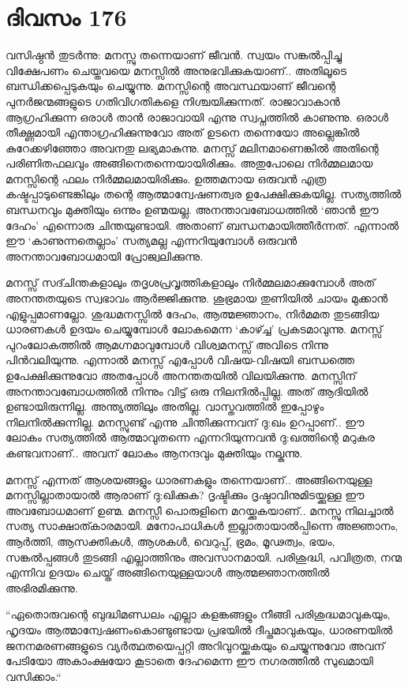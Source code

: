 \section{ദിവസം 176}


വസിഷ്ഠൻ തുടർന്നു: മനസ്സു തന്നെയാണ്‌ ജീവൻ. സ്വയം സങ്കൽപ്പിച്ചു വിക്ഷേപണം ചെയ്തവയെ മനസ്സിൽ അനുഭവിക്കുകയാണ്‌.. അതിലൂടെ ബന്ധിക്കപ്പെടുകയും ചെയ്യുന്നു. മനസ്സിന്റെ അവസ്ഥയാണ്‌ ജീവന്റെ പുനർജന്മങ്ങളുടെ ഗതിവിഗതികളെ നിശ്ചയിക്കുന്നത്. രാജാവാകാൻ ആഗ്രഹിക്കുന്ന ഒരാൾ താൻ രാജാവായി എന്നു സ്വപ്നത്തിൽ കാണുന്നു. ഒരാൾ തീക്ഷ്ണമായി എന്താഗ്രഹിക്കുന്നുവോ അത് ഉടനെ തന്നെയോ അല്ലെങ്കിൽ കുറേക്കഴിഞ്ഞോ അവനതു ലഭ്യമാകുന്നു. മനസ്സ് മലിനമാണെങ്കിൽ അതിന്റെ പരിണിതഫലവും അങ്ങിനെതന്നെയായിരിക്കും. അതുപോലെ നിർമ്മലമായ മനസ്സിന്റെ ഫലം നിർമ്മലമായിരിക്കും. ഉത്തമനായ ഒരുവൻ എത്ര കഷ്ടപ്പാടുണ്ടെങ്കിലും തന്റെ ആത്മാന്വേഷണത്വര ഉപേക്ഷിക്കുകയില്ല. സത്യത്തിൽ ബന്ധനവും മുക്തിയും ഒന്നും ഉണ്മയല്ല. അനന്താവബോധത്തിൽ ‘ഞാൻ ഈ ദേഹം’ എന്നൊരു ചിന്തയുണ്ടായി. അതാണ്‌ ബന്ധനമായിത്തീർന്നത്. എന്നാൽ ഈ ‘കാണുന്നതെല്ലാം’ സത്യമല്ല എന്നറിയുമ്പോൾ ഒരുവൻ അനന്താവബോധമായി പ്രോജ്വലിക്കുന്നു.

മനസ്സ് സദ്ചിന്തകളാലും തദൃശപ്രവൃത്തികളാലും നിർമ്മലമാക്കുമ്പോൾ അത് അനന്തതയുടെ സ്വഭാവം ആർജ്ജിക്കുന്നു. ശുഭ്രമായ തുണിയിൽ ചായം മുക്കാൻ എളുപ്പമാണല്ലോ. ശുദ്ധമനസ്സിൽ ദേഹം, ആത്മജ്ഞാനം, നിർമമത തുടങ്ങിയ ധാരണകൾ ഉദയം ചെയ്യുമ്പോൾ ലോകമെന്ന ‘കാഴ്ച്ച’ പ്രകടമാവുന്നു. മനസ്സ് പുറംലോകത്തിൽ ആമഗ്നമാവുമ്പോൾ വിശ്വമനസ്സ് അവിടെ നിന്നു പിൻവലിയുന്നു. എന്നാൽ മനസ്സ് എപ്പോൾ വിഷയ-വിഷയി ബന്ധത്തെ ഉപേക്ഷിക്കുന്നുവോ അതപ്പോൾ അനന്തതയിൽ വിലയിക്കുന്നു. മനസ്സിന് അനന്താവബോധത്തിൽ നിന്നും വിട്ട് ഒരു നിലനിൽപ്പില്ല. അത് ആദിയിൽ ഉണ്ടായിരുന്നില്ല. അന്ത്യത്തിലും അതില്ല. വാസ്തവത്തിൽ ഇപ്പോഴും നിലനിൽക്കുന്നില്ല. മനസ്സുണ്ട് എന്നു ചിന്തിക്കുന്നവന്‌ ദു:ഖം ഉറപ്പാണ്‌.. ഈ ലോകം സത്യത്തിൽ ആത്മാവുതന്നെ എന്നറിയുന്നവൻ ദു:ഖത്തിന്റെ മറുകര കണ്ടവനാണ്‌.. അവന്‌ ലോകം ആനന്ദവും മുക്തിയും നല്കുന്നു.

മനസ്സ് എന്നത് ആശയങ്ങളും ധാരണകളും തന്നെയാണ്‌.. അങ്ങിനെയുള്ള മനസ്സില്ലാതായാൽ ആരാണ്‌ ദു:ഖിക്കുക? ദൃഷ്ടിക്കും ദൃഷ്ടാവിനുമിടയ്ക്കുള്ള ഈ അവബോധമാണ്‌ ഉണ്മ. മനസ്സീ പൊരുളിനെ മറയ്ക്കുകയാണ്‌.. മനസ്സു നിലച്ചാൽ സത്യ സാക്ഷാത്കാരമായി. മനോപാധികൾ ഇല്ലാതായാൽപ്പിന്നെ അജ്ഞാനം, ആർത്തി, ആസക്തികൾ, ആശകൾ, വെറുപ്പ്, ഭ്രമം, മൂഢത്വം, ഭയം, സങ്കൽപ്പങ്ങൾ തുടങ്ങി എല്ലാത്തിനും അവസാനമായി. പരിശുദ്ധി, പവിത്രത, നന്മ എന്നിവ ഉദയം ചെയ്ത് അങ്ങിനെയുള്ളയാൾ ആത്മജ്ഞാനത്തിൽ അഭിരമിക്കുന്നു.

“ഏതൊരുവന്റെ ബുദ്ധിമണ്ഡലം എല്ലാ കളങ്കങ്ങളും നീങ്ങി പരിശുദ്ധമാവുകയും, ഹൃദയം ആത്മാന്വേഷണംകൊണ്ടുണ്ടായ പ്രഭയിൽ ദീപ്തമാവുകയും, ധാരണയിൽ ജനനമരണങ്ങളുടെ വ്യർത്ഥതയെപ്പറ്റി അറിവുറയ്ക്കുകയും ചെയ്യുന്നുവോ അവന്‌ പേടിയോ അകാംക്ഷയോ കൂടാതെ ദേഹമെന്ന ഈ നഗരത്തിൽ സുഖമായി വസിക്കാം.“ 

